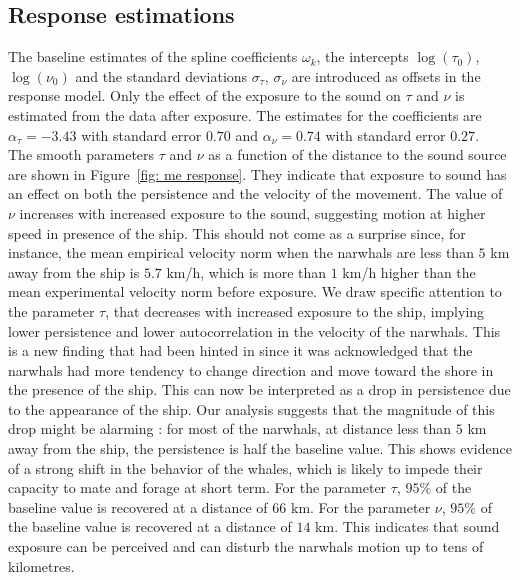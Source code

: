 \documentclass[11pt]{article}
\newcommand {\1}{\mathbb{1}}
\theoremstyle{definition}
\theoremstyle{remark}
\theoremstyle{remark}
\begin{document}
\subsection{Response estimations}

The baseline estimates of the spline coefficients $\omega_k$, the intercepts $\log(\tau_0)$, $\log(\nu_0)$ and the standard deviations $\sigma_{\tau}$, $\sigma_{\nu}$ are introduced as offsets in the response model. Only the effect of the exposure to the sound on $\tau$ and $\nu$ is estimated from the data after exposure. The estimates for the coefficients are $\alpha_{\tau}=-3.43$ with standard error $0.70$ and $\alpha_{\nu}=0.74$ with standard error $0.27$.\\

The smooth parameters $\tau$ and $\nu$ as a function of the distance to the sound source are shown in Figure~\ref{fig: me response}. They indicate that exposure to sound has an effect on both the persistence and the velocity of the movement. The value of $\nu$ increases with increased exposure to the sound, suggesting motion at higher speed in presence of the ship. This should not come as a surprise since, for instance, the mean empirical velocity norm when the narwhals are less than $5$ km away from the ship is $5.7$ km/h, which is more than $1$ km/h higher than the mean experimental velocity norm before exposure. We draw specific attention to the parameter $\tau$, that decreases with increased exposure to the ship, implying lower persistence and lower autocorrelation in the velocity of the narwhals. This is a new finding that had been hinted in \cite{heide-jorgensen_behavioral_2021} since it was acknowledged that the narwhals had more tendency to change direction and move toward the shore in the presence of the ship. This can now be interpreted as a drop in persistence due to the appearance of the ship. Our analysis suggests that the magnitude of this drop might be alarming : for most of the narwhals, at distance less than $5$ km away from the ship, the persistence is half the baseline value. This shows evidence of a strong shift in the behavior of the whales, which is likely to impede their capacity to mate and forage at short term.
For the parameter $\tau$, $95\%$ of the baseline value is recovered at a distance of $66$ km. For the parameter $\nu$, $95\%$ of the baseline value is recovered at a distance of $14$ km. This indicates that sound exposure can be perceived and can disturb the narwhals motion up to tens of kilometres.
 
\end{document}
